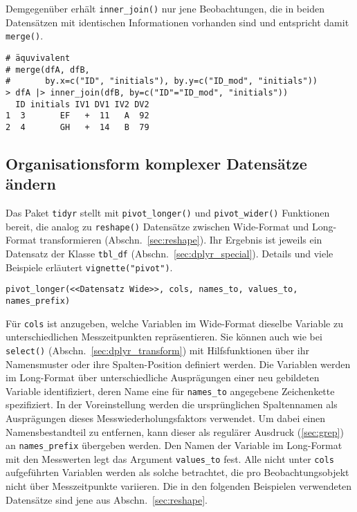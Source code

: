 Demgegenüber erhält \lstinline!inner_join()! nur jene Beobachtungen, die in beiden Datensätzen mit identischen Informationen vorhanden sind und entspricht damit \lstinline!merge()!.
\begin{lstlisting}
# äquvivalent
# merge(dfA, dfB,
#       by.x=c("ID", "initials"), by.y=c("ID_mod", "initials"))
> dfA |> inner_join(dfB, by=c("ID"="ID_mod", "initials"))
  ID initials IV1 DV1 IV2 DV2
1  3       EF   +  11   A  92
2  4       GH   +  14   B  79
\end{lstlisting}

\subsection{Organisationsform komplexer Datensätze ändern}
\label{sec:tidyr_reshape}

Das Paket \lstinline!tidyr! \cite{Wickham2014d} stellt mit \lstinline!pivot_longer()! und \lstinline!pivot_wider()! Funktionen bereit, die analog zu \lstinline!reshape()! Datensätze zwischen Wide-Format und Long-Format transformieren (Abschn.\ \ref{sec:reshape}). Ihr Ergebnis ist jeweils ein Datensatz der Klasse \lstinline!tbl_df! (Abschn.\ \ref{sec:dplyr_special}). Details und viele Beispiele erläutert \lstinline!vignette("pivot")!.

\begin{lstlisting}
pivot_longer(<<Datensatz Wide>>, cols, names_to, values_to, names_prefix)
\end{lstlisting}
Für \lstinline!cols! ist anzugeben, welche Variablen im Wide-Format dieselbe Variable zu unterschiedlichen Messzeitpunkten repräsentieren. Sie können auch wie bei \lstinline!select()! (Abschn.\ \ref{sec:dplyr_transform}) mit Hilfsfunktionen über ihr Namensmuster oder ihre Spalten-Position definiert werden. Die Variablen werden im Long-Format über unterschiedliche Ausprägungen einer neu gebildeten Variable identifiziert, deren Name eine für \lstinline!names_to! angegebene Zeichenkette spezifiziert. In der Voreinstellung werden die ursprünglichen Spaltennamen als Ausprägungen dieses Messwiederholungsfaktors verwendet. Um dabei einen Namensbestandteil zu entfernen, kann dieser als regulärer Ausdruck (\ref{sec:grep}) an \lstinline!names_prefix! übergeben werden. Den Namen der Variable im Long-Format mit den Messwerten legt das Argument \lstinline!values_to! fest. Alle nicht unter \lstinline!cols! aufgeführten Variablen werden als solche betrachtet, die pro Beobachtungsobjekt nicht über Messzeitpunkte variieren. Die in den folgenden Beispielen verwendeten Datensätze sind jene aus Abschn.\ \ref{sec:reshape}.

